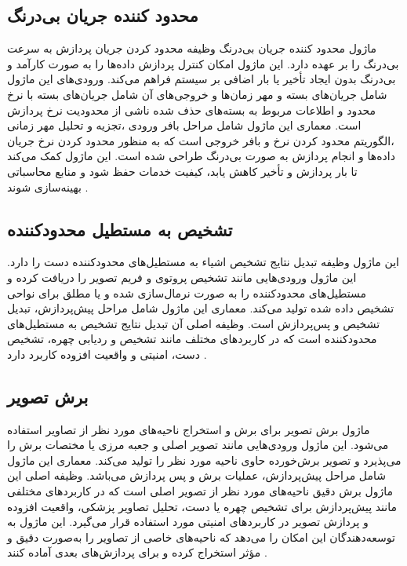 \subsection{محدود کننده جریان بی‌درنگ\protect{}}
ماژول محدود کننده جریان بی‌درنگ وظیفه محدود کردن جریان پردازش به سرعت بی‌درنگ را بر عهده دارد. این ماژول امکان کنترل پردازش داده‌ها را به صورت کارآمد و بی‌درنگ بدون ایجاد تأخیر یا بار اضافی 
بر سیستم فراهم می‌کند.  ورودی‌های این ماژول شامل جریان‌های بسته و مهر زمان‌ها  و خروجی‌های آن شامل جریان‌های بسته با نرخ محدود و اطلاعات مربوط به 
بسته‌های حذف شده ناشی از محدودیت نرخ پردازش است. معماری این ماژول شامل مراحل بافر ورودی ،تجزیه و تحلیل مهر زمانی ،الگوریتم محدود کردن نرخ  و
بافر خروجی است که به منظور محدود کردن نرخ جریان داده‌ها و انجام پردازش به صورت بی‌درنگ طراحی شده است. این ماژول کمک می‌کند تا بار پردازش و تأخیر کاهش یابد، کیفیت خدمات حفظ شود و منابع محاسباتی بهینه‌سازی شوند \cite{zhang2020mediapipe}.


\subsection{تشخیص به مستطیل محدودکننده\protect{}}
این ماژول وظیفه تبدیل نتایج تشخیص اشیاء به مستطیل‌های محدودکننده دست را دارد. این ماژول ورودی‌هایی مانند تشخیص پروتوی و فریم تصویر را دریافت کرده و مستطیل‌های محدودکننده را به صورت 
نرمال‌سازی شده و یا مطلق برای نواحی تشخیص داده شده تولید می‌کند. معماری این ماژول شامل مراحل  پیش‌پردازش، تبدیل تشخیص و پس‌پردازش است. وظیفه اصلی آن تبدیل نتایج تشخیص به 
مستطیل‌های محدودکننده است که در کاربردهای مختلف مانند تشخیص و ردیابی چهره، تشخیص دست، امنیتی و واقعیت افزوده کاربرد دارد \cite{zhang2020mediapipe}.


\subsection{برش تصویر \protect{}}
ماژول برش تصویر برای برش و استخراج ناحیه‌های مورد نظر از تصاویر استفاده می‌شود. این ماژول ورودی‌هایی مانند تصویر اصلی و جعبه مرزی یا مختصات برش را می‌پذیرد و تصویر برش‌خورده حاوی ناحیه مورد 
نظر را تولید می‌کند. معماری این ماژول شامل مراحل پیش‌پردازش، عملیات برش  و پس‌ پردازش  می‌باشد. وظیفه اصلی این ماژول برش دقیق ناحیه‌های مورد نظر از تصویر اصلی است که در کاربردهای 
مختلفی مانند پیش‌پردازش برای تشخیص چهره یا دست، تحلیل تصاویر پزشکی، واقعیت افزوده و پردازش تصویر در کاربردهای امنیتی مورد استفاده قرار می‌گیرد. این ماژول به 
توسعه‌دهندگان این امکان را می‌دهد که ناحیه‌های خاصی از تصاویر را به‌صورت دقیق و مؤثر استخراج کرده و برای پردازش‌های بعدی آماده کنند \cite{zhang2020mediapipe}.


